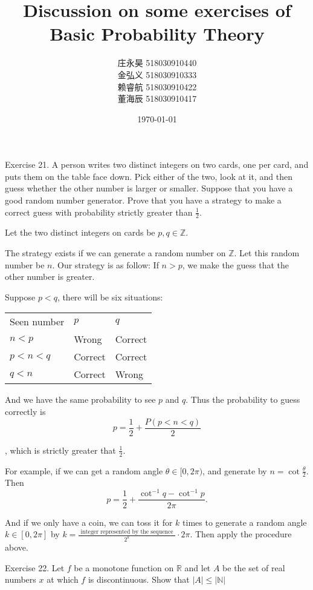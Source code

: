 \documentclass[UTF8, a4paper, linespread=1.5]{article}
\title{Discussion on some exercises of Basic Probability Theory}
\date{\today}
\author{庄永昊 518030910440 \\ 金弘义 518030910333 \\ 赖睿航 518030910422 \\ 董海辰 518030910417}
\begin{document}
\maketitle

\begin{thm}{Exercise 21.}{}
A person writes two distinct integers on two cards, one per card,
and puts them on the table face down. Pick either of the two, look at it, and then guess
whether the other number is larger or smaller. Suppose that you have a good random number
generator. Prove that you have a strategy to make a correct guess with probability strictly
greater than $\frac{1}{2}$.
\end{thm}

Let the two distinct integers on cards be $p, q \in \mathbb{Z} $.

The strategy exists if we can generate a random number on $\mathbb{Z} $. Let this random number be $n$.
Our strategy is as follow: If $n > p$, we make the guess that the other number is greater.

Suppose $p < q$, there will be six situations:

\begin{table}[h!]
    \centering
    \begin{tabular}{lll}
        Seen number   & $p$     & $q$     \\
        $n < p$         & Wrong   & Correct \\
        $p < n < q$ & Correct & Correct \\
        $q < n$     & Correct & Wrong
    \end{tabular}
\end{table}

And we have the same probability to see $p$ and $q$. Thus the probability to guess correctly is
$$p = \frac{1}{2} + \frac{P(p < n < q)}{2}$$

, which is strictly greater that $\frac{1}{2}$.

For example, if we can get a random angle $\theta \in [0,2\pi)$, and generate by $n = \cot \frac{\theta}{2}$. Then $$p = \frac{1}{2} + \frac{\cot^{-1} q - \cot^{-1} p}{2\pi}.$$

And if we only have a coin, we can toss it for $k$ times to generate a random angle $k \in [0, 2\pi]$ by
$k = \frac{\text{ integer represented by the sequence }}{2^k} \cdot 2\pi$. Then apply the procedure above.

\begin{thm}{Exercise 22.}{}
	 Let $f$ be a monotone function on $\mathbb{R}$ and let $A$ be the set of real numbers $x$ at which $f$ is discontinuous. Show that $|A| \le |\mathbb{N}|$
\end{thm}
\end{document}
